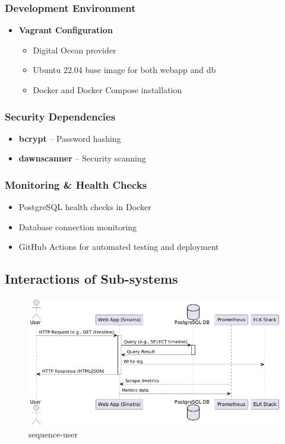 \subsubsection{Development Environment}
\begin{itemize}
    \item \textbf{Vagrant Configuration}
    \begin{itemize}
        \item Digital Ocean provider
        \item Ubuntu 22.04 base image for both webapp and db
        \item Docker and Docker Compose installation
    \end{itemize}
\end{itemize}

\subsubsection{Security Dependencies}
\begin{itemize}
    \item \textbf{bcrypt} -- Password hashing
    \item \textbf{dawnscanner} -- Security scanning
\end{itemize}

\subsubsection{Monitoring \& Health Checks}
\begin{itemize}
    \item PostgreSQL health checks in Docker
    \item Database connection monitoring
    \item GitHub Actions for automated testing and deployment
\end{itemize} 

\subsection{Interactions of Sub-systems}

\begin{figure}[H]
    \centering
    \includegraphics[width=1\linewidth]{images/sequence_user.png}
    \caption{sequence-user}
    \label{fig:seq-user}
\end{figure}

